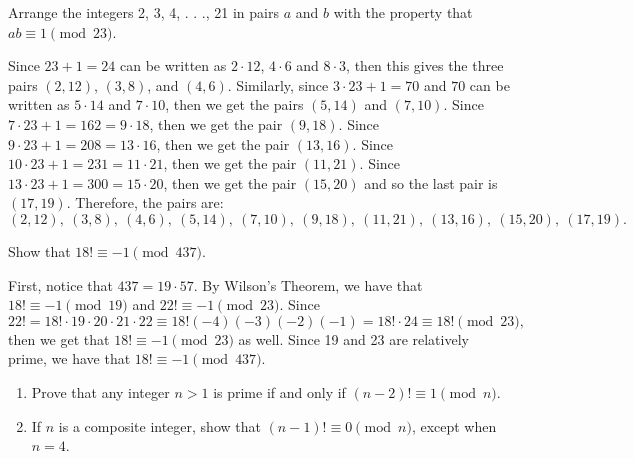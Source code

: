 \begin{exercise}
    Arrange the integers 2, 3, 4, . . ., 21 in pairs $a$ and $b$ with the property that $ab \equiv 1 \pmod{23}$.\\
\end{exercise}

\begin{solution}
    Since $23 + 1 = 24$ can be written as $2\cdot 12$, $4\cdot 6$ and $8\cdot 3$, then this gives the three pairs $(2, 12)$, $(3, 8)$, and $(4, 6)$. Similarly, since $3\cdot 23 + 1 = 70$ and $70$ can be written as $5 \cdot 14$ and $7 \cdot 10$, then we get the pairs $(5, 14)$ and $(7,10)$. Since $7\cdot 23 + 1 = 162 = 9\cdot 18$, then we get the pair $(9, 18)$. Since $9\cdot 23 + 1 = 208 = 13\cdot 16$, then we get the pair $(13, 16)$. Since $10\cdot 23 + 1 = 231 = 11\cdot 21$, then we get the pair $(11, 21)$. Since $13\cdot 23 + 1 = 300 = 15\cdot 20$, then we get the pair $(15, 20)$ and so the last pair is $(17, 19)$. Therefore, the pairs are:
    $$(2, 12), \ (3,8), \ (4, 6), \ (5, 14), \ (7, 10), \ (9,18), \ (11, 21), \ (13, 16), \ (15, 20), \ (17, 19).$$
\end{solution}

\begin{exercise}
    Show that $18! \equiv -1 \pmod{437}$. \\
\end{exercise}

\begin{solution}
    First, notice that $437 = 19 \cdot 57$. By Wilson's Theorem, we have that $18! \equiv - 1 \pmod{19}$ and $22! \equiv - 1 \pmod{23}$. Since
    $$22! = 18!\cdot 19 \cdot 20 \cdot 21 \cdot 22 \equiv 18!(-4)(-3)(-2)(-1) = 18! \cdot 24 \equiv 18! \pmod{23},$$
    then we get that $18! \equiv - 1 \pmod{23}$ as well. Since 19 and 23 are relatively prime, we have that $18! \equiv - 1 \pmod{437}$. \\
\end{solution}

\begin{exercise}
    \begin{enumerate}
        \item Prove that any integer $n > 1$ is prime if and only if $(n-2)! \equiv 1 \pmod n$.
        \item If $n$ is a composite integer, show that $(n-1)! \equiv 0 \pmod n$, except when $n = 4$.
    \end{enumerate}
\end{exercise}

